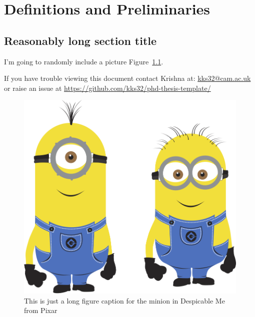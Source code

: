 
\chapter{Definitions and Preliminaries}

\ifpdf
    \graphicspath{{Chapter2/Figs/Raster/}{Chapter2/Figs/PDF/}{Chapter2/Figs/}}
\else
    \graphicspath{{Chapter2/Figs/Vector/}{Chapter2/Figs/}}
\fi


\section[Short title]{Reasonably long section title}

I'm going to randomly include a picture Figure~\ref{fig:minion}.


If you have trouble viewing this document contact Krishna at: \href{mailto:kks32@cam.ac.uk}{kks32@cam.ac.uk} or raise an issue at \url{https://github.com/kks32/phd-thesis-template/}


\begin{figure}[htbp!] 
\centering    
\includegraphics[width=1.0\textwidth]{minion}
\caption[Minion]{This is just a long figure caption for the minion in Despicable Me from Pixar}
\label{fig:minion}
\end{figure}

